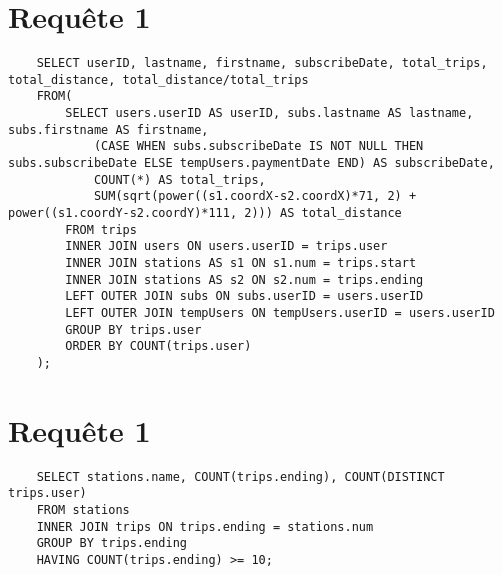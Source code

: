 \documentclass[a4paper,11pt]{article}
\begin{document}
\section{Requ\^ete 1}
    \begin{lstlisting}
    SELECT userID, lastname, firstname, subscribeDate, total_trips, total_distance, total_distance/total_trips
    FROM(
        SELECT users.userID AS userID, subs.lastname AS lastname, subs.firstname AS firstname,
            (CASE WHEN subs.subscribeDate IS NOT NULL THEN subs.subscribeDate ELSE tempUsers.paymentDate END) AS subscribeDate,
            COUNT(*) AS total_trips,
            SUM(sqrt(power((s1.coordX-s2.coordX)*71, 2) + power((s1.coordY-s2.coordY)*111, 2))) AS total_distance
        FROM trips
        INNER JOIN users ON users.userID = trips.user
        INNER JOIN stations AS s1 ON s1.num = trips.start
        INNER JOIN stations AS s2 ON s2.num = trips.ending
        LEFT OUTER JOIN subs ON subs.userID = users.userID
        LEFT OUTER JOIN tempUsers ON tempUsers.userID = users.userID
        GROUP BY trips.user
        ORDER BY COUNT(trips.user)
    );
    \end{lstlisting}


\section{Requ\^ete 1}
    \begin{lstlisting}
    SELECT stations.name, COUNT(trips.ending), COUNT(DISTINCT trips.user)
    FROM stations
    INNER JOIN trips ON trips.ending = stations.num
    GROUP BY trips.ending
    HAVING COUNT(trips.ending) >= 10;
    \end{lstlisting}
\end{document}
